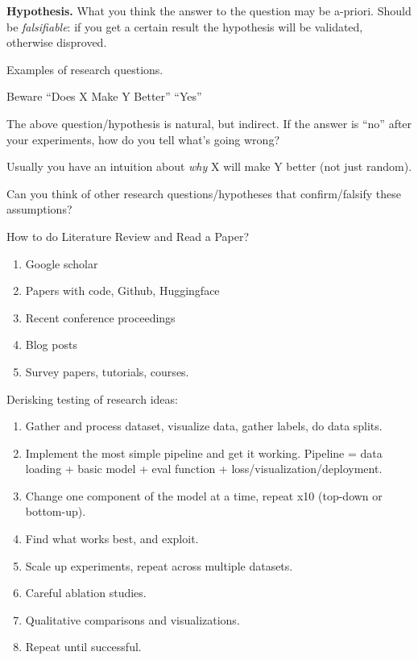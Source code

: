 \textbf{Hypothesis.} What you think the answer to the question may be a-priori.
Should be \textit{falsifiable}: if you get a certain result the hypothesis will be validated, otherwise disproved.

Examples of research questions.

Beware ``Does X Make Y Better'' ``Yes''

The above question/hypothesis is natural, but indirect.
If the answer is ``no'' after your experiments, how do you tell what's going wrong?

Usually you have an intuition about \textit{why} X will make Y better (not just random).

Can you think of other research questions/hypotheses that confirm/falsify these assumptions?

How to do Literature Review and Read a Paper?
\begin{enumerate}
    \item Google scholar
    \item Papers with code, Github, Huggingface
    \item Recent conference proceedings
    \item Blog posts
    \item Survey papers, tutorials, courses.
\end{enumerate}

Derisking testing of research ideas:
\begin{enumerate}
    \item Gather and process dataset, visualize data, gather labels, do data splits.
    \item Implement the most simple pipeline and get it working. Pipeline = data loading + basic model + eval function + loss/visualization/deployment.
    \item Change one component of the model at a time, repeat x10 (top-down or bottom-up).
    \item Find what works best, and exploit.
    \item Scale up experiments, repeat across multiple datasets.
    \item Careful ablation studies.
    \item Qualitative comparisons and visualizations.
    \item Repeat until successful.
\end{enumerate}

